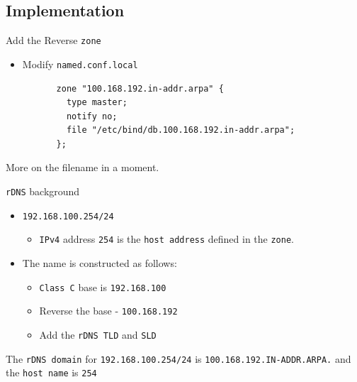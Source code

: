 \documentclass[xcolor=table]{beamer}
\begin{document}
\subsection{Implementation}
\begin{frame}[fragile]{Add the Reverse \texttt{zone}}
  \begin{itemize}
    \item Modify \texttt{named.conf.local}
  \end{itemize}
  \begin{tcolorbox}
    \lstset{
      basicstyle=\tiny\ttfamily,
    }
    \begin{lstlisting}
          zone "100.168.192.in-addr.arpa" {
            type master;
            notify no;
            file "/etc/bind/db.100.168.192.in-addr.arpa";
          };
    \end{lstlisting}
  \end{tcolorbox}
  \begin{tcolorbox}[title={\textbf{NOTE:}}]
    \begin{center}
      \scriptsize More on the filename in a moment.
    \end{center}
  \end{tcolorbox}
\end{frame}

\begin{frame}{\texttt{rDNS} background}
  \begin{itemize}
    \item \texttt{192.168.100.254/24} 
      \begin{itemize}
        \item \texttt{IPv4} address \texttt{254} is the \texttt{host address} defined in the \texttt{zone}.
      \end{itemize}
    \item The name is constructed as follows:
      \begin{itemize}
        \item \texttt{Class C}  base is \texttt{192.168.100}
        \item Reverse the base - \texttt{100.168.192}
        \item Add the \texttt{rDNS TLD} and \texttt{SLD}
      \end{itemize}
  \end{itemize}
  \begin{tcolorbox}
    \begin{center}
      The \texttt{rDNS domain} for \texttt{192.168.100.254/24} is \texttt{100.168.192.IN-ADDR.ARPA.} and the \texttt{host name} is \texttt{254}       
    \end{center}
  \end{tcolorbox}
\end{frame}
\end{document}
